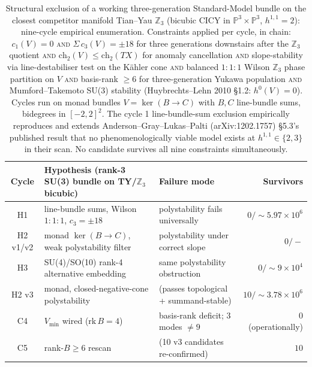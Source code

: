 \begin{table}[t]
\centering
\caption{Structural exclusion of a working three-generation Standard-Model bundle on the closest competitor manifold Tian--Yau $\mathbb{Z}_3$ (bicubic CICY in $\mathbb{P}^3 \times \mathbb{P}^3$, $h^{1,1}=2$): nine-cycle empirical enumeration. Constraints applied per cycle, in chain: $c_1(V)=0$ \textsc{and} $\Sigma\,c_3(V)=\pm 18$ for three generations downstairs after the $\mathbb{Z}_3$ quotient \textsc{and} $\mathrm{ch}_2(V) \le \mathrm{ch}_2(TX)$ for anomaly cancellation \textsc{and} slope-stability via line-destabiliser test on the Kähler cone \textsc{and} balanced $1{:}1{:}1$ Wilson $\mathbb{Z}_3$ phase partition on $V$ \textsc{and} basis-rank $\ge 6$ for three-generation Yukawa population \textsc{and} Mumford--Takemoto SU(3) stability (Huybrechts--Lehn 2010 §1.2: $h^0(V) = 0$). Cycles run on monad bundles $V = \ker(B \to C)$ with $B, C$ line-bundle sums, bidegrees in $[-2,2]^2$. The cycle 1 line-bundle-sum exclusion empirically reproduces and extends Anderson--Gray--Lukas--Palti (arXiv:1202.1757) §5.3's published result that no phenomenologically viable model exists at $h^{1,1}\in\{2,3\}$ in their scan. No candidate survives all nine constraints simultaneously.}
\label{tab:cy3-ty-exclusion}
\begin{ruledtabular}
\begin{tabular}{cllr}
Cycle & Hypothesis (rank-3 SU(3) bundle on TY/$\mathbb{Z}_3$ bicubic) & Failure mode & Survivors \\
\hline
H1 & line-bundle sums, Wilson $1{:}1{:}1$, $c_3=\pm 18$        & polystability fails universally        & $0/{\sim}5.97\times 10^6$ \\
H2 v1/v2 & monad $\ker(B\to C)$, weak polystability filter         & polystability under correct slope     & $0/-$ \\
H3 & SU(4)/SO(10) rank-4 alternative embedding                & same polystability obstruction         & $0/{\sim}9 \times 10^4$ \\
H2 v3 & monad, closed-negative-cone polystability               & (passes topological + summand-stable)  & $10/{\sim}3.78\times 10^6$ \\
C4 & $V_{\min}$ wired ($\mathrm{rk}\,B = 4$)                  & basis-rank deficit; $3$ modes $\neq 9$ & $0$ (operationally) \\
C5 & rank-$B \ge 6$ rescan                                   & (10 v3 candidates re-confirmed)        & $10$ \\

\end{tabular}
\end{ruledtabular}
\end{table}
